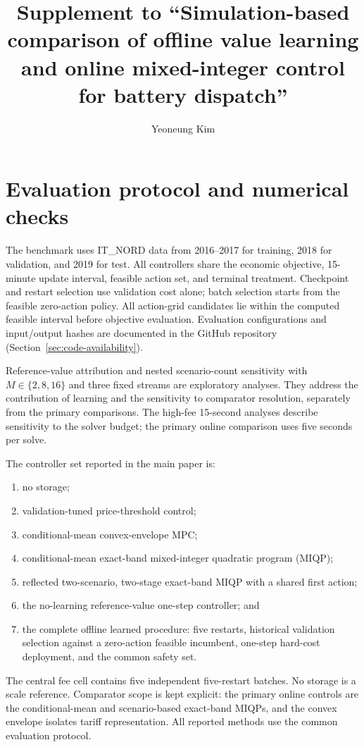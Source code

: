 \documentclass[preprint,11pt]{elsarticle}
\begin{document}
\begin{frontmatter}
\title{Supplement to ``Simulation-based comparison of offline value learning
and online mixed-integer control for battery dispatch''}
\author[aff1]{Yeoneung Kim}
\end{frontmatter}

\section{Evaluation protocol and numerical checks}

The benchmark uses IT\_NORD data from 2016--2017 for training, 2018 for
validation, and 2019 for test. All controllers share the economic objective,
15-minute update interval, feasible action set, and terminal treatment.
Checkpoint and restart selection use validation cost alone; batch selection
starts from the feasible zero-action policy. All action-grid candidates lie within the
computed feasible interval before objective evaluation. Evaluation
configurations and input/output hashes are documented in the GitHub repository
(Section~\ref{sec:code-availability}).

Reference-value attribution and nested scenario-count sensitivity with
$M\in\{2,8,16\}$ and three fixed streams are exploratory analyses. They
address the contribution of learning and the sensitivity to comparator
resolution, separately from the primary comparisons. The high-fee
15-second analyses describe sensitivity to the solver budget; the primary
online comparison uses five seconds per solve.

The controller set reported in the main paper is:
\begin{enumerate}
\item no storage;
\item validation-tuned price-threshold control;
\item conditional-mean convex-envelope MPC;
\item conditional-mean exact-band mixed-integer quadratic program (MIQP);
\item reflected two-scenario, two-stage exact-band MIQP with a shared first
action;
\item the no-learning reference-value one-step controller; and
\item the complete offline learned procedure: five restarts, historical
validation selection against a zero-action feasible incumbent, one-step
hard-cost deployment, and the common safety set.
\end{enumerate}
The central fee cell contains five independent five-restart batches. No
storage is a scale reference. Comparator scope is kept explicit: the primary online
controls are the conditional-mean and scenario-based exact-band MIQPs, and the
convex envelope isolates tariff representation. All reported methods use the
common evaluation protocol.
\end{document}

